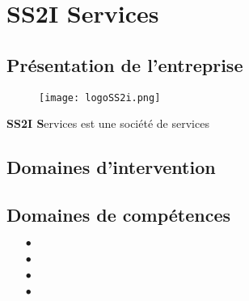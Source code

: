 \section{SS2I Services}
	\subsection{Présentation de l'entreprise}
		\vspace{0.3cm}

		\begin{wrapfigure}[10]{r}{6.5cm}
			\vspace{-0.7cm}
			\texttt{[image: logoSS2i.png]}
		\end{wrapfigure}
	
		\textbf{SS2I S}ervices est une société de services 


	\subsection{Domaines d'intervention}
		\vspace{0.3cm}

		

	\subsection{Domaines de compétences}
		\vspace{0.3cm}

		\begin{itemize}
			\item[$\bullet$]

			\item[$\bullet$] 

			\item[$\bullet$] 

			\item[$\bullet$] 
		\end{itemize}

\newpage
